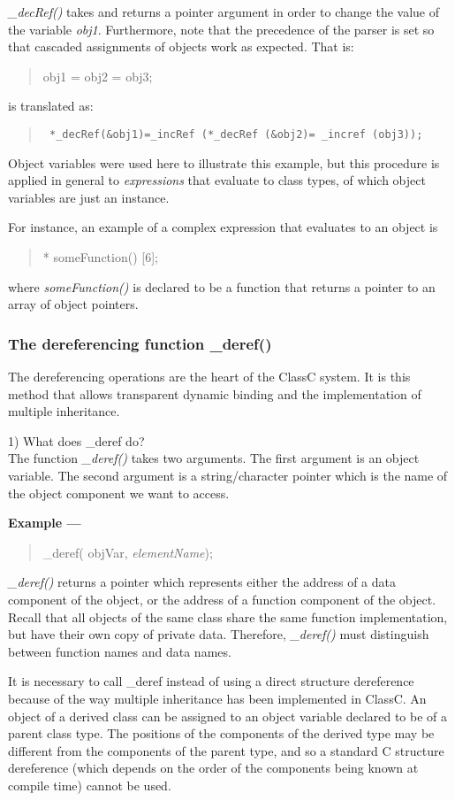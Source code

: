 {\em \_decRef()} takes and returns a pointer argument in order to change
the value of the variable {\em obj1}.  Furthermore, note that the precedence
of the parser is set so that cascaded assignments of objects work as
expected.  That is:
\begin{quote}
obj1 = obj2 = obj3;
\end{quote}
is translated as:
\begin{quote} \tt
*\_decRef(\&obj1)=\_incRef (*\_decRef (\&obj2)= \_incref (obj3));
\end{quote}

Object variables were used here to illustrate this example, but this
procedure is applied in general to {\em expressions} that evaluate to
class types, of which object variables are just an instance.

For instance, an example of a complex expression that evaluates to an object is
\begin{quote}
* someFunction() [6];
\end{quote}
where {\em someFunction()} is declared to be a function that returns a
pointer to an array of object pointers.

\subsubsection{The dereferencing function \_deref()}

The dereferencing operations are the heart of the ClassC system.  It is
this method that allows transparent dynamic binding and the implementation
of multiple inheritance.

1) What does \_deref do?\\
The function {\em \_deref()} takes two arguments.  The first argument is an
object variable.  The second argument is a string/character pointer which
is the name of the object component we want to access.

{\noindent \bf Example ---}
\begin{quote}
\_deref( objVar, {\em elementName});
\end{quote}
{\em \_deref()} returns a pointer which represents either the address of a data
component of the object, or the address of a function component of the
object.  Recall that all objects of the same class share the same function
implementation, but have their own copy of private data.  Therefore,
{\em \_deref()} must distinguish between function names and data names.

It is necessary to call \_deref instead of using a direct structure
dereference because of the way multiple inheritance has been implemented
in ClassC.  An object of a derived class can be assigned to an
object variable declared to be of a parent class type.  The positions
of the components of the derived type may be different from the components
of the parent type, and so a standard C structure dereference (which
depends on the order of the components being known at compile time)
cannot be used.

